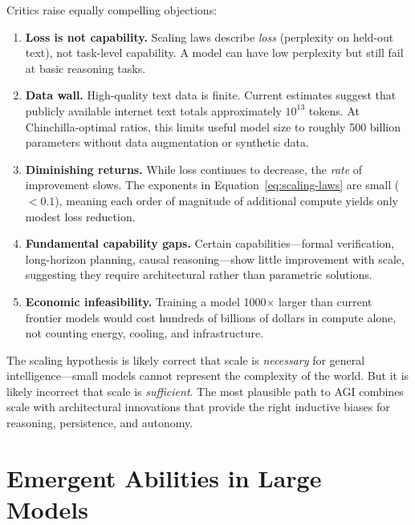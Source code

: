Critics raise equally compelling objections:

\begin{enumerate}[leftmargin=1.8em]
  \item \textbf{Loss is not capability.} Scaling laws describe \emph{loss} (perplexity on held-out text), not task-level capability. A model can have low perplexity but still fail at basic reasoning tasks.
  \item \textbf{Data wall.} High-quality text data is finite. Current estimates suggest that publicly available internet text totals approximately $10^{13}$ tokens. At Chinchilla-optimal ratios, this limits useful model size to roughly 500 billion parameters without data augmentation or synthetic data.
  \item \textbf{Diminishing returns.} While loss continues to decrease, the \emph{rate} of improvement slows. The exponents in Equation~\ref{eq:scaling-laws} are small ($< 0.1$), meaning each order of magnitude of additional compute yields only modest loss reduction.
  \item \textbf{Fundamental capability gaps.} Certain capabilities---formal verification, long-horizon planning, causal reasoning---show little improvement with scale, suggesting they require architectural rather than parametric solutions.
  \item \textbf{Economic infeasibility.} Training a model 1000$\times$ larger than current frontier models would cost hundreds of billions of dollars in compute alone, not counting energy, cooling, and infrastructure.
\end{enumerate}

\begin{keyinsight}
The scaling hypothesis is likely correct that scale is \emph{necessary} for general intelligence---small models cannot represent the complexity of the world. But it is likely incorrect that scale is \emph{sufficient}. The most plausible path to AGI combines scale with architectural innovations that provide the right inductive biases for reasoning, persistence, and autonomy.
\end{keyinsight}

\section{Emergent Abilities in Large Models}
\label{sec:emergent-abilities}

